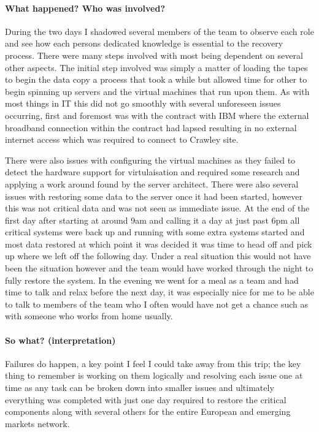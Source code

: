 \paragraph{What happened? Who was
involved?}\label{what-happened-who-was-involved}

During the two days I shadowed several members of the team to observe
each role and see how each persons dedicated knowledge is essential to
the recovery process. There were many steps involved with most being
dependent on several other aspects. The initial step involved was simply
a matter of loading the tapes to begin the data copy a process that took
a while but allowed time for other to begin spinning up servers and the
virtual machines that run upon them. As with most things in IT this did
not go smoothly with several unforeseen issues occurring, first and
foremost was with the contract with IBM where the external broadband
connection within the contract had lapsed resulting in no external
internet access which was required to connect to Crawley site.

There were also issues with configuring the virtual machines as they
failed to detect the hardware support for virtulaisation and required
some research and applying a work around found by the server architect.
There were also several issues with restoring some data to the server
once it had been started, however this was not critical data and was not
seen as immediate issue. At the end of the first day after starting at
around 9am and calling it a day at just past 6pm all critical systems
were back up and running with some extra systems started and most data
restored at which point it was decided it was time to head off and pick
up where we left off the following day. Under a real situation this
would not have been the situation however and the team would have worked
through the night to fully restore the system. In the evening we went
for a meal as a team and had time to talk and relax before the next day,
it was especially nice for me to be able to talk to members of the team
who I often would have not get a chance such as with someone who works
from home usually.

\paragraph{So what? (interpretation)}\label{so-what-interpretation}

Failures do happen, a key point I feel I could take away from this trip;
the key thing to remember is working on them logically and resolving
each issue one at time as any task can be broken down into smaller
issues and ultimately everything was completed with just one day
required to restore the critical components along with several others
for the entire European and emerging markets network.

